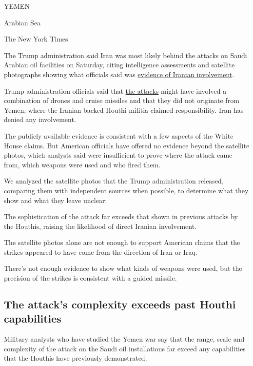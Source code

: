 YEMEN

Arabian Sea

The New York Times

The Trump administration said Iran was most likely behind the attacks on
Saudi Arabian oil facilities on Saturday, citing intelligence
assessments and satellite photographs showing what officials said was
\href{https://www.nytimes3xbfgragh.onion/2019/09/15/world/middleeast/iran-us-saudi-arabia-attack.html?action=click\&module=Top\%20Stories\&pgtype=Homepage}{evidence
of Iranian involvement}.

Trump administration officials said that
\href{https://www.nytimes3xbfgragh.onion/2019/09/14/world/middleeast/saudi-arabia-refineries-drone-attack.html?module=inline}{the
attacks} might have involved a combination of drones and cruise missiles
and that they did not originate from Yemen, where the Iranian-backed
Houthi militia claimed responsibility. Iran has denied any involvement.

The publicly available evidence is consistent with a few aspects of the
White House claims. But American officials have offered no evidence
beyond the satellite photos, which analysts said were insufficient to
prove where the attack came from, which weapons were used and who fired
them.

We analyzed the satellite photos that the Trump administration released,
comparing them with independent sources when possible, to determine what
they show and what they leave unclear:

The sophistication of the attack far exceeds that shown in previous
attacks by the Houthis, raising the likelihood of direct Iranian
involvement.

The satellite photos alone are not enough to support American claims
that the strikes appeared to have come from the direction of Iran or
Iraq.

There's not enough evidence to show what kinds of weapons were used, but
the precision of the strikes is consistent with a guided missile.

\hypertarget{the-attacks-complexity-exceeds-past-houthi-capabilities}{%
\subsection{The attack's complexity exceeds past Houthi
capabilities}\label{the-attacks-complexity-exceeds-past-houthi-capabilities}}

Military analysts who have studied the Yemen war say that the range,
scale and complexity of the attack on the Saudi oil installations far
exceed any capabilities that the Houthis have previously demonstrated.

